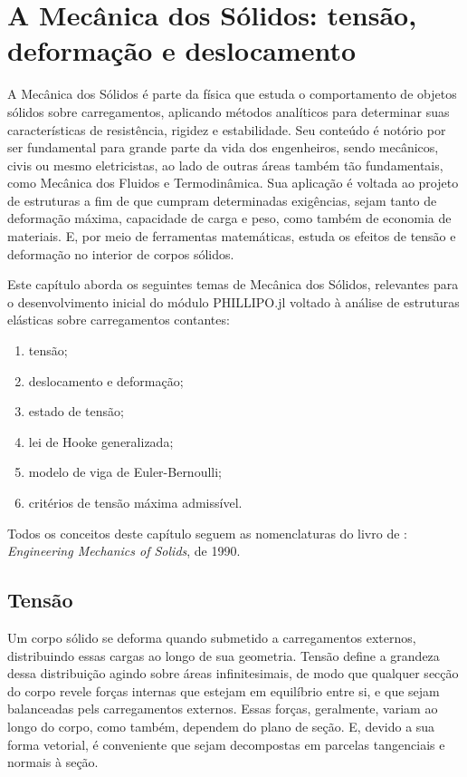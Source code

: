 \chapter{A Mecânica dos Sólidos: tensão, deformação e deslocamento}

A Mecânica dos Sólidos é parte da física que estuda o comportamento de objetos sólidos sobre carregamentos, aplicando métodos analíticos para determinar suas características de resistência, rigidez e estabilidade. Seu conteúdo é notório por ser fundamental para grande parte da vida dos engenheiros, sendo mecânicos, civis ou mesmo eletricistas, ao lado de outras áreas também tão fundamentais, como Mecânica dos Fluidos e Termodinâmica. Sua aplicação é voltada ao projeto de estruturas a fim de que cumpram determinadas exigências, sejam tanto de deformação máxima, capacidade de carga e peso, como também de economia de materiais. E, por meio de ferramentas matemáticas, estuda os efeitos de tensão e deformação no interior de corpos sólidos. \cite{popov}

Este capítulo aborda os seguintes temas de Mecânica dos Sólidos, relevantes para o desenvolvimento inicial do módulo PHILLIPO.jl voltado à análise de estruturas elásticas sobre carregamentos contantes:
\begin{enumerate}
    \item tensão;
    \item deslocamento e deformação;
    \item estado de tensão;
    \item lei de Hooke generalizada;
    \item modelo de viga de Euler-Bernoulli;
    \item critérios de tensão máxima admissível.
\end{enumerate}

Todos os conceitos deste capítulo seguem as nomenclaturas do livro de \citeauthor{popov}: \emph{Engineering Mechanics of Solids}, de 1990.

\section{Tensão}

Um corpo sólido se deforma quando submetido a carregamentos externos, distribuindo essas cargas ao longo de sua geometria. Tensão define a grandeza dessa distribuição agindo sobre áreas infinitesimais, de modo que qualquer secção do corpo revele forças internas que estejam em equilíbrio entre si, e que sejam balanceadas pels carregamentos externos. Essas forças, geralmente, variam ao longo do corpo, como também, dependem do plano de seção. E, devido a sua forma vetorial, é conveniente que sejam decompostas em parcelas tangenciais e normais à seção. \cite{popov}

